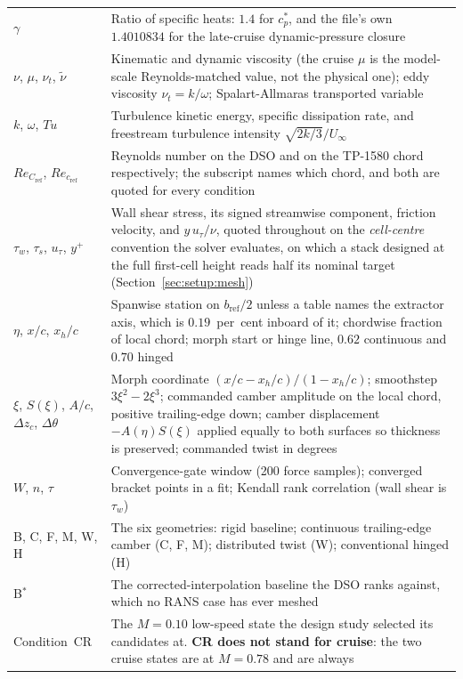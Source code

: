 \documentclass[10pt,a4paper]{article}
\begin{document}
{\begin{longtable}{@{}p{}p{}@{}}
$\gamma$ & Ratio of specific heats: $1.4$ for $c_p^{*}$, and the file's own $\num{1.4010834}$ for
  the late-cruise dynamic-pressure closure \\
$\nu$, $\mu$, $\nu_t$, $\tilde{\nu}$ & Kinematic and dynamic viscosity (the cruise $\mu$ is the
  model-scale Reynolds-matched value, not the physical one); eddy viscosity $\nu_t=k/\omega$;
  Spalart-Allmaras transported variable \\
$k$, $\omega$, $Tu$ & Turbulence kinetic energy, specific dissipation rate, and freestream
  turbulence intensity $\sqrt{2k/3}/U_\infty$ \\
$Re_{C_\mathrm{ref}}$, $Re_{c_\mathrm{ref}}$ & Reynolds number on the DSO and on the TP-1580 chord
  respectively; the subscript names which chord, and both are quoted for every condition \\
$\tau_w$, $\tau_s$, $u_\tau$, $y^+$ & Wall shear stress, its signed streamwise component, friction
  velocity, and $y\,u_\tau/\nu$, quoted throughout on the \emph{cell-centre} convention the solver
  evaluates, on which a stack designed at the full first-cell height reads half its nominal
  target (Section~\ref{sec:setup:mesh}) \\
\addlinespace
$\eta$, $x/c$, $x_h/c$ & Spanwise station on $b_\mathrm{ref}/2$ unless a table names the extractor
  axis, which is $0.19$~per~cent inboard of it; chordwise fraction of local chord; morph start or
  hinge line, $0.62$ continuous and $0.70$ hinged \\
$\xi$, $S(\xi)$, $A/c$, $\Delta z_c$, $\Delta\theta$ & Morph coordinate
  $(x/c-x_h/c)/(1-x_h/c)$; smoothstep $3\xi^2-2\xi^3$; commanded camber amplitude on the local
  chord, positive trailing-edge down; camber displacement $-A(\eta)S(\xi)$ applied equally to both
  surfaces so thickness is preserved; commanded twist in degrees \\
\addlinespace
$W$, $n$, $\tau$ & Convergence-gate window (200 force samples); converged bracket points in a fit;
  Kendall rank correlation (wall shear is $\tau_w$) \\
B, C, F, M, W, H & The six geometries: rigid baseline; continuous trailing-edge camber (C, F, M);
  distributed twist (W); conventional hinged (H) \\
B$^{*}$ & The corrected-interpolation baseline the DSO ranks against, which no RANS case has ever
  meshed \\
Condition~CR & The $M = 0.10$ low-speed state the design study selected its candidates at.
  \textbf{CR does not stand for cruise}: the two cruise states are at $M = 0.78$ and are always

\end{longtable}}
\end{document}
